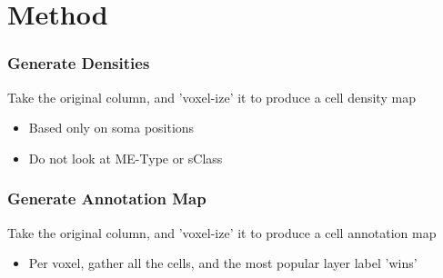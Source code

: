 \documentclass{beamer}
\begin{document}
\section{Method}
\begin{frame}
  \frametitle{Generate Densities}
  Take the original column, and 'voxel-ize' it to produce a cell density map
  \begin{itemize}
     \item Based only on soma positions
     \item Do not look at ME-Type or sClass
  \end{itemize}
\end{frame}

\begin{frame}
  \frametitle{Generate Annotation Map}
  Take the original column, and 'voxel-ize' it to produce a cell annotation map
  \begin{itemize}
     \item Per voxel, gather all the cells, and the most popular layer label 'wins'
  \end{itemize}
\end{frame}
\end{document}
